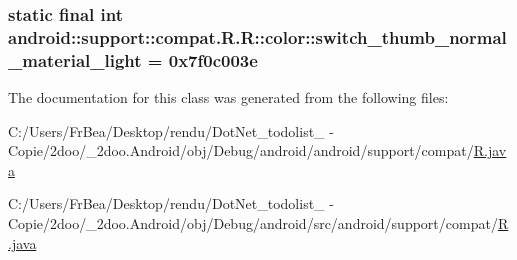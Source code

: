 \hypertarget{classandroid_1_1support_1_1compat_1_1_r_1_1color_9eb523b5ef2ede1c33ab0052947a3504}{
\subsubsection[{switch\_\-thumb\_\-normal\_\-material\_\-light}]{\setlength{\rightskip}{0pt plus 5cm}static final int android::support::compat.R.R::color::switch\_\-thumb\_\-normal\_\-material\_\-light = 0x7f0c003e}}
\label{classandroid_1_1support_1_1compat_1_1_r_1_1color_9eb523b5ef2ede1c33ab0052947a3504}




The documentation for this class was generated from the following files:\begin{CompactItemize}
\item 
C:/Users/FrBea/Desktop/rendu/DotNet\_\-todolist\_ - Copie/2doo/\_\-2doo.Android/obj/Debug/android/android/support/compat/\hyperlink{android_2support_2compat_2_r_8java}{R.java}\item 
C:/Users/FrBea/Desktop/rendu/DotNet\_\-todolist\_ - Copie/2doo/\_\-2doo.Android/obj/Debug/android/src/android/support/compat/\hyperlink{src_2android_2support_2compat_2_r_8java}{R.java}\end{CompactItemize}
